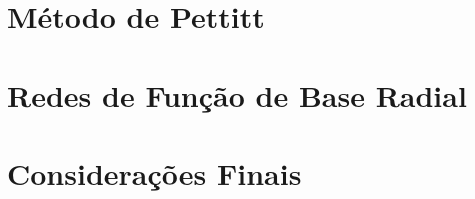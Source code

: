 \documentclass[qual, classic, a4paper]{ufbathesis}
\begin{document}
\section{Método de Pettitt}
\blindtext

\section{Redes de Função de Base Radial}
\blindtext

\section{Considerações Finais}
\blindtext


\backmatter





%
% 
% 

\end{document}
